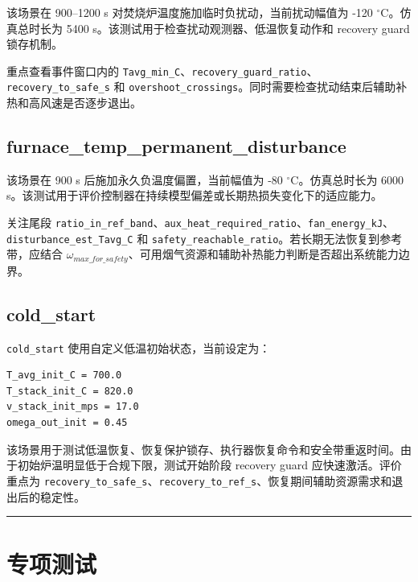\documentclass[UTF8,openany,zihao=-4,oneside]{ctexbook}
\providecommand{\passthrough}[1]{#1}
\newcommand{\manualdivider}{\par\vspace{0.6em}\noindent\textcolor{FGLine}{\rule{\linewidth}{0.7pt}}\vspace{0.6em}\par}
\begin{document}
该场景在 900--1200 s 对焚烧炉温度施加临时负扰动，当前扰动幅值为 -120 \(^\circ\mathrm{C}\)。仿真总时长为 5400 s。该测试用于检查扰动观测器、低温恢复动作和 recovery guard 锁存机制。

重点查看事件窗口内的 \passthrough{\lstinline!Tavg_min_C!}、\passthrough{\lstinline!recovery_guard_ratio!}、\passthrough{\lstinline!recovery_to_safe_s!} 和 \passthrough{\lstinline!overshoot_crossings!}。同时需要检查扰动结束后辅助补热和高风速是否逐步退出。

\subsection{furnace\_temp\_permanent\_disturbance}\label{subsec:test-permanent-disturbance}

该场景在 900 s 后施加永久负温度偏置，当前幅值为 -80 \(^\circ\mathrm{C}\)。仿真总时长为 6000 s。该测试用于评价控制器在持续模型偏差或长期热损失变化下的适应能力。

关注尾段 \passthrough{\lstinline!ratio_in_ref_band!}、\passthrough{\lstinline!aux_heat_required_ratio!}、\passthrough{\lstinline!fan_energy_kJ!}、\passthrough{\lstinline!disturbance_est_Tavg_C!} 和 \passthrough{\lstinline!safety_reachable_ratio!}。若长期无法恢复到参考带，应结合 \(\omega_{max\_for\_safety}\)、可用烟气资源和辅助补热能力判断是否超出系统能力边界。

\subsection{cold\_start}\label{subsec:test-cold-start}

\passthrough{\lstinline!cold_start!} 使用自定义低温初始状态，当前设定为：

\begin{lstlisting}
T_avg_init_C = 700.0
T_stack_init_C = 820.0
v_stack_init_mps = 17.0
omega_out_init = 0.45
\end{lstlisting}

该场景用于测试低温恢复、恢复保护锁存、执行器恢复命令和安全带重返时间。由于初始炉温明显低于合规下限，测试开始阶段 recovery guard 应快速激活。评价重点为 \passthrough{\lstinline!recovery_to_safe_s!}、\passthrough{\lstinline!recovery_to_ref_s!}、恢复期间辅助资源需求和退出后的稳定性。

\manualdivider

\section{专项测试}\label{sec:special-tests}
\end{document}
